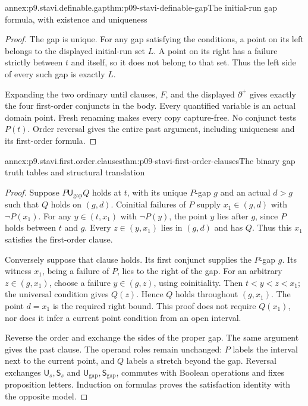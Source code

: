 \begin{annexitem}{annex:p9.stavi.definable.gap}{thm:p09-stavi-definable-gap}{The initial-run gap formula, with existence and uniqueness}
\begin{proof}
The gap is unique. For any
gap satisfying the conditions,
a point on its left belongs
to the displayed initial-run
set \(L\). A point on its
right has a failure strictly
between \(t\) and itself,
so it does not belong to
that set. Thus the left
side of every such gap
is exactly \(L\).

Expanding the two ordinary
until clauses, \(F\), and
the displayed \(\partial^+\)
gives exactly the four
first-order conjuncts in
the body. Every quantified
variable is an actual
domain point. Fresh
renaming makes every
copy capture-free.
No conjunct tests \(P(t)\).
Order reversal gives the
entire past argument,
including uniqueness and
its first-order formula.
\end{proof}
\end{annexitem}

\begin{annexitem}{annex:p9.stavi.first.order.clauses}{thm:p09-stavi-first-order-clauses}{The binary gap truth tables and structural translation}
\begin{proof}
Suppose \(P\mathbin{\mathsf U_{\mathrm{gap}}}Q\)
holds at \(t\), with its unique \(P\)-gap \(g\)
and an actual \(d>g\) such that \(Q\) holds
on \((g,d)\). Coinitial failures of \(P\)
supply \(x_1\in(g,d)\) with \(\neg P(x_1)\).
For any \(y\in(t,x_1)\) with \(\neg P(y)\),
the point \(y\) lies after \(g\), since
\(P\) holds between \(t\) and \(g\).
Every \(z\in(y,x_1)\) lies in \((g,d)\)
and has \(Q\). Thus this \(x_1\) satisfies
the first-order clause.

Conversely suppose that clause holds.
Its first conjunct supplies the \(P\)-gap
\(g\). Its witness \(x_1\), being a
failure of \(P\), lies to the right of
the gap. For an arbitrary \(z\in(g,x_1)\),
choose a failure \(y\in(g,z)\), using
coinitiality. Then \(t<y<z<x_1\);
the universal condition gives \(Q(z)\).
Hence \(Q\) holds throughout \((g,x_1)\).
The point \(d=x_1\) is the required
right bound. This proof does not require
\(Q(x_1)\), nor does it infer a current
point condition from an open interval.

Reverse the order and exchange the sides
of the proper gap. The same argument
gives the past clause. The operand
roles remain unchanged: \(P\) labels
the interval next to the current point,
and \(Q\) labels a stretch beyond the
gap. Reversal exchanges
\(\mathsf U_s,\mathsf S_s\) and
\(\mathsf U_{\mathrm{gap}},\mathsf S_{\mathrm{gap}}\),
commutes with Boolean operations and
fixes proposition letters. Induction
on formulas proves the satisfaction
identity with the opposite model.


\end{proof}
\end{annexitem}
